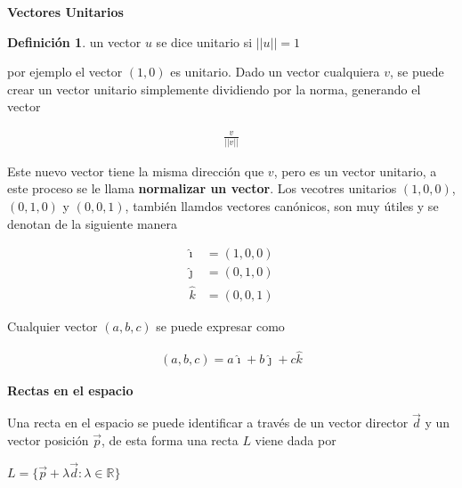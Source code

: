 \documentclass{article}
\theoremstyle{plain}
\theoremstyle{definition}
\newtheorem{defin}[thm]{Definición}
\begin{document}
\begin{center}
\textbf{\large{Vectores Unitarios}} \\
\end{center}


\begin{defin}un vector $u$ se dice unitario si $|| u || =1$ \\
\end{defin}

por ejemplo el vector $(1,0)$ es unitario. Dado un vector cualquiera $v$, se puede crear un vector unitario simplemente dividiendo por la norma, generando el vector

\begin{align*}
    \frac{v}{|| v||}
\end{align*}

Este nuevo vector tiene la misma dirección que $v$, pero es un vector unitario, a este proceso se le llama \textbf{normalizar un vector}. Los vecotres unitarios $(1,0,0)$, $(0,1,0)$ y $(0,0,1)$, también llamdos vectores canónicos, son muy útiles y se denotan de la siguiente manera

\begin{align*}
    \hat{\imath} &= (1,0,0) \\
    \hat{\jmath} &= (0,1,0) \\
    \hat{k} &= (0,0,1)
\end{align*}

Cualquier vector $(a,b,c)$ se puede expresar como

\begin{align*}
    (a,b,c) = a\hat{\imath}+b\hat{\jmath} +c\hat{k}
\end{align*}










\newpage

\begin{center}
\textbf{\large{Rectas en el espacio}} \\
\end{center}


Una recta en el espacio se puede identificar a través de un vector director $\overrightarrow{d}$ y un vector posición $\overrightarrow{p}$, de esta forma una recta $L$ viene dada por

\begin{center}
$L = \lbrace \overrightarrow{p} + \lambda \overrightarrow{d} : \lambda \in \mathbb{R}\rbrace$
\end{center}
\end{document}
